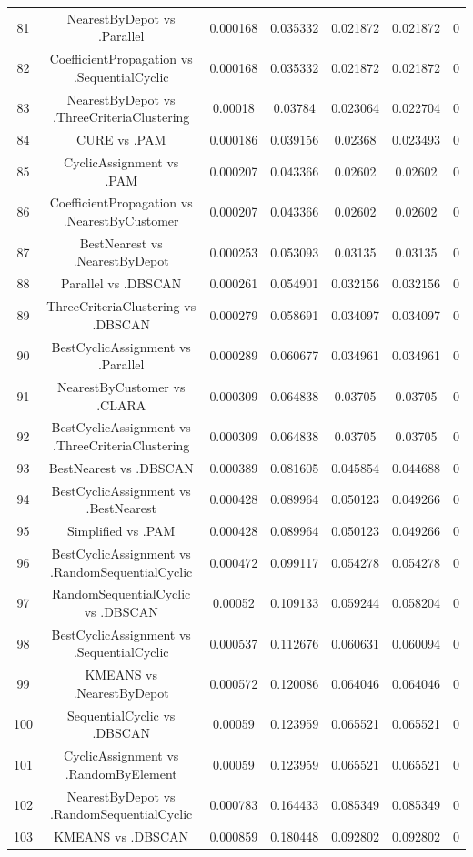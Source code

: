 \documentclass[a4paper,10pt]{article}
\begin{document}
\begin{landscape}
\begin{table}[!htp]
\begin{tabular}{ccccccc}
81&NearestByDepot vs .Parallel&0.000168&0.035332&0.021872&0.021872&0\\
82&CoefficientPropagation vs .SequentialCyclic&0.000168&0.035332&0.021872&0.021872&0\\
83&NearestByDepot vs .ThreeCriteriaClustering&0.00018&0.03784&0.023064&0.022704&0\\
84&CURE vs .PAM&0.000186&0.039156&0.02368&0.023493&0\\
85&CyclicAssignment vs .PAM&0.000207&0.043366&0.02602&0.02602&0\\
86&CoefficientPropagation vs .NearestByCustomer&0.000207&0.043366&0.02602&0.02602&0\\
87&BestNearest vs .NearestByDepot&0.000253&0.053093&0.03135&0.03135&0\\
88&Parallel vs .DBSCAN&0.000261&0.054901&0.032156&0.032156&0\\
89&ThreeCriteriaClustering vs .DBSCAN&0.000279&0.058691&0.034097&0.034097&0\\
90&BestCyclicAssignment vs .Parallel&0.000289&0.060677&0.034961&0.034961&0\\
91&NearestByCustomer vs .CLARA&0.000309&0.064838&0.03705&0.03705&0\\
92&BestCyclicAssignment vs .ThreeCriteriaClustering&0.000309&0.064838&0.03705&0.03705&0\\
93&BestNearest vs .DBSCAN&0.000389&0.081605&0.045854&0.044688&0\\
94&BestCyclicAssignment vs .BestNearest&0.000428&0.089964&0.050123&0.049266&0\\
95&Simplified vs .PAM&0.000428&0.089964&0.050123&0.049266&0\\
96&BestCyclicAssignment vs .RandomSequentialCyclic&0.000472&0.099117&0.054278&0.054278&0\\
97&RandomSequentialCyclic vs .DBSCAN&0.00052&0.109133&0.059244&0.058204&0\\
98&BestCyclicAssignment vs .SequentialCyclic&0.000537&0.112676&0.060631&0.060094&0\\
99&KMEANS vs .NearestByDepot&0.000572&0.120086&0.064046&0.064046&0\\
100&SequentialCyclic vs .DBSCAN&0.00059&0.123959&0.065521&0.065521&0\\
101&CyclicAssignment vs .RandomByElement&0.00059&0.123959&0.065521&0.065521&0\\
102&NearestByDepot vs .RandomSequentialCyclic&0.000783&0.164433&0.085349&0.085349&0\\
103&KMEANS vs .DBSCAN&0.000859&0.180448&0.092802&0.092802&0\\

\end{tabular}
\end{table}
\end{landscape}
\end{document}
